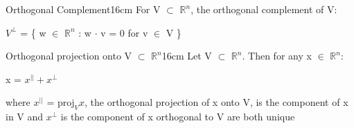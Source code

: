     \begin{definition}{Orthogonal Complement}{16cm}
        For V $\subset$ $\mathbb{R}^n$, the {\color{lblue} orthogonal complement}
        of V:

        \hspace{0.5cm}
        $V^{\perp}$
        = \{ w $\in$ $\mathbb{R}^n$ : w $\cdot$ v = 0 for v $\in$ V \}
    \end{definition}

    \newpage



    \begin{wtheorem}{Orthogonal projection onto V $\subset$ $\mathbb{R}^n$}{16cm}
        Let V $\subset$ $\mathbb{R}^n$. Then for any x $\in$ $\mathbb{R}^n$:

        \hspace{0.5cm}
        x = $x^{||} + x^{\perp}$

        where $x^{||}$ = $\text{proj}_Vx$,
        the {\color{lblue} orthogonal projection} of x onto V,
        is the component of x in V
        and $x^{\perp}$ is the component of x orthogonal to V
        are both unique
    \end{wtheorem}

